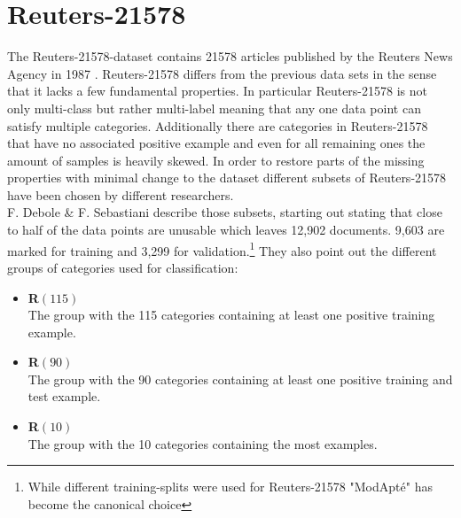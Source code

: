 \section{Reuters-21578}
The Reuters-21578-dataset contains 21578 articles published by the Reuters News Agency in 1987 \cite{Reuters-21578}. Reuters-21578 differs from the previous data sets in the sense that it lacks a few fundamental properties. In particular Reuters-21578 is not only multi-class but rather multi-label meaning that any one data point can satisfy multiple categories. Additionally there are categories in Reuters-21578 that have no associated positive example and even for all remaining ones the amount of samples is heavily skewed. In order to restore parts of the missing properties with minimal change to the dataset different subsets of Reuters-21578 have been chosen by different researchers.\\
F. Debole \& F. Sebastiani \cite{Reuters-Subsets} describe those subsets, starting out stating that close to half of the data points are unusable which leaves 12,902 documents. 9,603 are marked for training and 3,299 for validation.\footnote{While different training-splits were used for Reuters-21578 "ModApt\'e" has become the canonical choice} They also point out the different groups of categories used for classification:
\begin{itemize}
	\item \textbf{R$\left(115\right)$}\\
	The group with the 115 categories containing at least one positive training example.\\ 
	\item \textbf{R$\left(90\right)$}\\
	The group with the 90 categories containing at least one positive training and test example.\\ 
	\item \textbf{R$\left(10\right)$}\\
	The group with the 10 categories containing the most examples. \\
\end{itemize} 